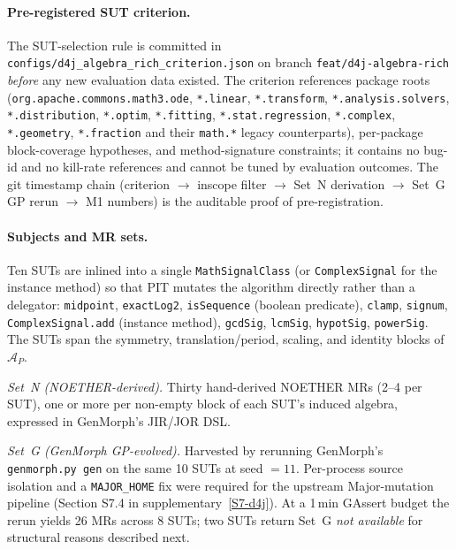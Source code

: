 \paragraph{Pre-registered SUT criterion.}
The SUT-selection rule is committed in
\texttt{configs/d4j\_algebra\_rich\_criterion.json} on branch
\texttt{feat/d4j-algebra-rich} \emph{before} any new evaluation data
existed. The criterion references package roots
(\texttt{org.apache.commons.math3.ode}, \texttt{*.linear},
\texttt{*.transform}, \texttt{*.analysis.solvers},
\texttt{*.distribution}, \texttt{*.optim}, \texttt{*.fitting},
\texttt{*.stat.regression}, \texttt{*.complex}, \texttt{*.geometry},
\texttt{*.fraction} and their \texttt{math.*} legacy counterparts),
per-package block-coverage hypotheses, and method-signature
constraints; it contains no bug-id and no kill-rate references and
cannot be tuned by evaluation outcomes. The git timestamp chain
(criterion $\rightarrow$ inscope filter $\rightarrow$ Set~N derivation
$\rightarrow$ Set~G GP rerun $\rightarrow$ M1 numbers) is the auditable
proof of pre-registration.

\paragraph{Subjects and MR sets.}
Ten SUTs are inlined into a single \texttt{MathSignalClass} (or
\texttt{ComplexSignal} for the instance method) so that PIT mutates
the algorithm directly rather than a delegator: \texttt{midpoint},
\texttt{exactLog2}, \texttt{isSequence} (boolean predicate),
\texttt{clamp}, \texttt{signum}, \texttt{ComplexSignal.add} (instance
method), \texttt{gcdSig}, \texttt{lcmSig}, \texttt{hypotSig},
\texttt{powerSig}. The SUTs span the symmetry, translation/period,
scaling, and identity blocks of $\mathcal{A}_P$.

\textit{Set~N (NOETHER-derived).} Thirty hand-derived NOETHER MRs
(2--4 per SUT), one or more per non-empty block of each SUT's induced
algebra, expressed in GenMorph's JIR/JOR DSL.

\textit{Set~G (GenMorph GP-evolved).} Harvested by rerunning
GenMorph's \texttt{genmorph.py gen} on the same 10 SUTs at seed $=11$.
Per-process source isolation and a \texttt{MAJOR\_HOME} fix were
required for the upstream Major-mutation pipeline (Section S7.4 in
supplementary~\ref{S7-d4j}). At a 1\,min GAssert budget the rerun
yields 26 MRs across 8 SUTs; two SUTs return Set~G \emph{not
available} for structural reasons described next.

